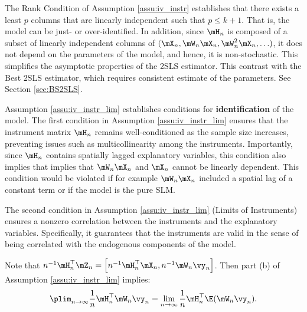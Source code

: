 The Rank Condition of Assumption \ref{assu:iv_instr} establishes that there exists a least $p$ columns that are linearly independent such that $p \leq k + 1$. That is, the model can be just- or over-identified. In addition, since $\mH_n$ is composed of a subset of linearly independent columns of $(\mX_n, \mW_n\mX_n, \mW^2_n\mX_n, \ldots)$, it does not depend on the parameters of the model, and hence, it is non-stochastic. This simplifies the asymptotic properties of the 2SLS estimator. This contrast with the Best 2SLS estimator, which requires consistent estimate of the parameters. See Section \ref{sec:BS2SLS}.   

Assumption \ref{assu:iv_instr_lim} establishes conditions for \textbf{identification} of the model. The first condition in Assumption \ref{assu:iv_instr_lim} ensures that the instrument matrix $\mH_n$ remains well-conditioned as the sample size increases, preventing issues such as multicollinearity among the instruments. Importantly, since $\mH_n$ contains spatially lagged explanatory variables, this condition also implies that implies that $\mW_n\mX_n$ and $\mX_n$ cannot be linearly dependent. This condition would be violated if for example $\mW_n\mX_n$ included a spatial lag of a constant term or if the model is the pure SLM.  

The second condition in Assumption \ref{assu:iv_instr_lim} (Limits of Instruments) ensures a nonzero correlation between the instruments and the explanatory variables. Specifically, it guarantees that the instruments are valid in the sense of being correlated with the endogenous components of the model.  

Note that $n^{-1}\mH_n^\top\mZ_n = \left[n^{-1}\mH_n^\top\mX_n, n^{-1}\mW_n\vy_n\right]$. Then part (b) of Assumption \ref{assu:iv_instr_lim} implies:
\begin{equation}\label{eq:implication-of-plimHQ}
\plim_{n\to\infty} \frac{1}{n}\mH_n^\top\mW_n\vy_n = \lim_{n\to \infty}\frac{1}{n}\mH_n^\top\E(\mW_n\vy_n). 
\end{equation}

